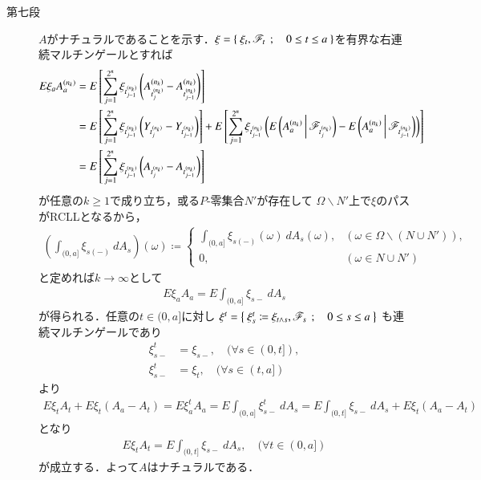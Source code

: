 \begin{prf}
\begin{description}
			\item[第七段]
				$A$がナチュラルであることを示す．$\xi = \left\{\ \xi_t,\mathscr{F}_t\ \, ; \quad 0 \leq t \leq a\ \right\}$を有界な右連続マルチンゲールとすれば
				\begin{align}
					E \xi_a A^{(n_k)}_a 
					&= E\left[ \sum_{j=1}^{2^n}\xi_{t^{(n_k)}_{j-1}} \left( A^{(n_k)}_{t^{(n_k)}_j} - A^{(n_k)}_{t^{(n_k)}_{j-1}} \right) \right]\\
					&= E\left[ \sum_{j=1}^{2^n}\xi_{t^{(n_k)}_{j-1}} \left( Y_{t^{(n_k)}_j} - Y_{t^{(n_k)}_{j-1}} \right) \right]
						+ E\left[ \sum_{j=1}^{2^n}\xi_{t^{(n_k)}_{j-1}} \left( E\left( A^{(n_k)}_a \, \middle|\, \mathscr{F}_{t^{(n_k)}_j} \right) - E\left( A^{(n_k)}_a \, \middle|\, \mathscr{F}_{t^{(n_k)}_{j-1}} \right) \right) \right] \\
					&= E\left[ \sum_{j=1}^{2^n}\xi_{t^{(n_k)}_{j-1}} \left( A_{t^{(n_k)}_j} - A_{t^{(n_k)}_{j-1}} \right) \right]
				\end{align}
				が任意の$k \geq 1$で成り立ち，或る$P$-零集合$N'$が存在して
				$\Omega \backslash N'$上で$\xi$のパスがRCLLとなるから，
				\begin{align}
					\left(\int_{(0,a]} \xi_{s(-)}\ dA_s\right)(\omega)
					\coloneqq 
					\begin{cases}
						\displaystyle\int_{(0,a]} \xi_{s(-)}(\omega)\ dA_s(\omega), & (\omega \in \Omega \backslash (N \cup N')), \\
						0, & (\omega \in N \cup N')
					\end{cases}
				\end{align}
				と定めれば$k \longrightarrow \infty$として
				\begin{align}
					E \xi_a A_a = E \int_{(0,a]} \xi_{s-}\ dA_s
				\end{align}
				が得られる．任意の$t \in (0,a]$に対し
				$\xi^t = \left\{\ \xi^t_s \coloneqq \xi_{t \wedge s},\mathscr{F}_s\ \, ; \quad 0 \leq s \leq a\ \right\}$
				も連続マルチンゲールであり
				\begin{align}
					\xi^t_{s-} &= \xi_{s-},\quad (\forall s \in (0,t]), \\
					\xi^t_{s-} &= \xi_t, \quad (\forall s \in (t,a])
				\end{align}
				より
				\begin{align}
					E \xi_t A_t + E \xi_t(A_a - A_t) = E \xi^t_a A_a 
					= E \int_{(0,a]} \xi^t_{s-}\ dA_s
					= E \int_{(0,t]} \xi_{s-}\ dA_s + E \xi_t (A_a - A_t)
				\end{align}
				となり
				\begin{align}
					E \xi_t A_t = E \int_{(0,t]} \xi_{s-}\ dA_s,
					\quad (\forall t \in (0,a])
				\end{align}
				が成立する．よって$A$はナチュラルである．
		\end{description}
	\end{prf}
	
